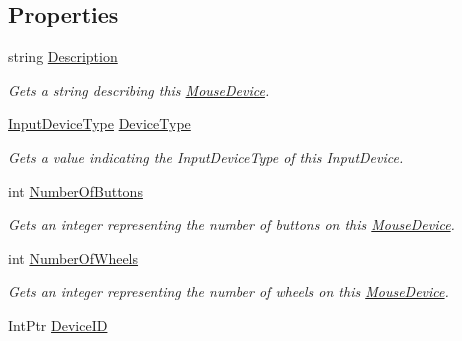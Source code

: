 \subsection*{Properties}
\begin{DoxyCompactItemize}
\item 
string \hyperlink{class_open_t_k_1_1_input_1_1_mouse_device_a0c31489165ae480b490e8ab0aa375fab}{Description}
\begin{DoxyCompactList}\small\item\em Gets a string describing this \hyperlink{class_open_t_k_1_1_input_1_1_mouse_device}{Mouse\-Device}. \end{DoxyCompactList}\item 
\hyperlink{namespace_open_t_k_1_1_input_a1d147c6256b0adaa5288eec90ed93270}{Input\-Device\-Type} \hyperlink{class_open_t_k_1_1_input_1_1_mouse_device_a4583df744630520f932eca2d821d5aa8}{Device\-Type}
\begin{DoxyCompactList}\small\item\em Gets a value indicating the Input\-Device\-Type of this Input\-Device. \end{DoxyCompactList}\item 
int \hyperlink{class_open_t_k_1_1_input_1_1_mouse_device_af253d36f1acd03668ef5153948089294}{Number\-Of\-Buttons}
\begin{DoxyCompactList}\small\item\em Gets an integer representing the number of buttons on this \hyperlink{class_open_t_k_1_1_input_1_1_mouse_device}{Mouse\-Device}. \end{DoxyCompactList}\item 
int \hyperlink{class_open_t_k_1_1_input_1_1_mouse_device_ace88c5884e2e50314644aedc8d29efcc}{Number\-Of\-Wheels}
\begin{DoxyCompactList}\small\item\em Gets an integer representing the number of wheels on this \hyperlink{class_open_t_k_1_1_input_1_1_mouse_device}{Mouse\-Device}. \end{DoxyCompactList}\item 
Int\-Ptr \hyperlink{class_open_t_k_1_1_input_1_1_mouse_device_a8ddb35f6a104a3db46481d2290d76f57}{Device\-I\-D}

\end{DoxyCompactItemize}
